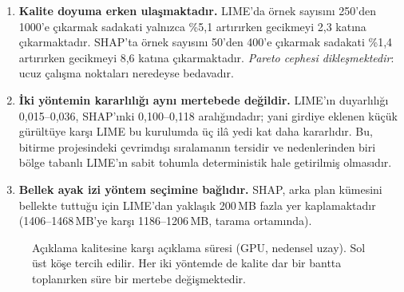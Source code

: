\documentclass[conference]{IEEEtran}
\begin{document}
\begin{enumerate}
\item \textbf{Kalite doyuma erken ulaşmaktadır.} LIME'da örnek sayısını 250'den
1000'e çıkarmak sadakati yalnızca \%5{,}1 artırırken gecikmeyi 2{,}3 katına
çıkarmaktadır. SHAP'ta örnek sayısını 50'den 400'e çıkarmak sadakati \%1{,}4
artırırken gecikmeyi 8{,}6 katına çıkarmaktadır. \emph{Pareto cephesi
dikleşmektedir}: ucuz çalışma noktaları neredeyse bedavadır.
\item \textbf{İki yöntemin kararlılığı aynı mertebede değildir.} LIME'ın
duyarlılığı 0{,}015--0{,}036, SHAP'ınki 0{,}100--0{,}118 aralığındadır; yani
girdiye eklenen küçük gürültüye karşı LIME bu kurulumda üç ilâ yedi kat daha
kararlıdır. Bu, bitirme projesindeki çevrimdışı sıralamanın tersidir ve
nedenlerinden biri bölge tabanlı LIME'ın sabit tohumla deterministik hale
getirilmiş olmasıdır.
\item \textbf{Bellek ayak izi yöntem seçimine bağlıdır.} SHAP, arka plan
kümesini bellekte tuttuğu için LIME'dan yaklaşık 200\,MB fazla yer kaplamaktadır
(1406--1468\,MB'ye karşı 1186--1206\,MB, tarama ortamında).
\end{enumerate}

\begin{figure}[t]
\centering
{}
\caption{Açıklama kalitesine karşı açıklama süresi (GPU, nedensel uzay). Sol üst
köşe tercih edilir. Her iki yöntemde de kalite dar bir bantta toplanırken süre
bir mertebe değişmektedir.}
\label{fig:pareto}
\end{figure}
\end{document}
